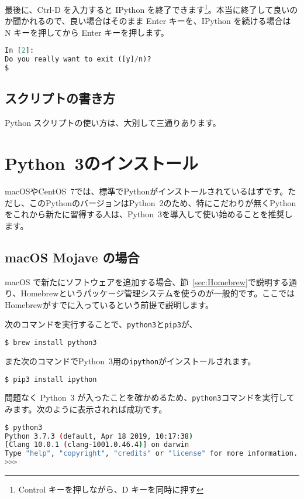 最後に、Ctrl-D を入力すると IPython を終了できます\footnote{Control キーを押しながら、D キーを同時に押す}。本当に終了して良いのか聞かれるので、良い場合はそのまま Enter キーを、IPython を続ける場合は N キーを押してから Enter キーを押します。

\begin{lstlisting}[language=python]
In [2]:
Do you really want to exit ([y]/n)? 
$ 
\end{lstlisting}

\subsection{スクリプトの書き方}

Python スクリプトの使い方は、大別して三通りあります。

\section{Python~3のインストール}
\label{sec:Python_Install}

macOSやCentOS~7では、標準でPythonがインストールされているはずです。ただし、このPythonのバージョンはPython~2のため、特にこだわりが無くPythonをこれから新たに習得する人は、Python~3を導入して使い始めることを推奨します。

\subsection{macOS Mojave の場合}

macOS で新たにソフトウェアを追加する場合、節~\ref{sec:Homebrew}で説明する通り、Homebrewというパッケージ管理システムを使うのが一般的です。ここではHomebrewがすでに入っているという前提で説明します。

次のコマンドを実行することで、\texttt{python3}と\texttt{pip3}が、
\begin{lstlisting}[language=bash]
$ brew install python3
\end{lstlisting}
また次のコマンドでPython~3用の\texttt{ipython}がインストールされます。
\begin{lstlisting}[language=bash]
$ pip3 install ipython
\end{lstlisting}

問題なく Python~3 が入ったことを確かめるため、\texttt{python3}コマンドを実行してみます。次のように表示されれば成功です。
\begin{lstlisting}[language=bash]
$ python3
Python 3.7.3 (default, Apr 18 2019, 10:17:38) 
[Clang 10.0.1 (clang-1001.0.46.4)] on darwin
Type "help", "copyright", "credits" or "license" for more information.
>>> 
\end{lstlisting}

